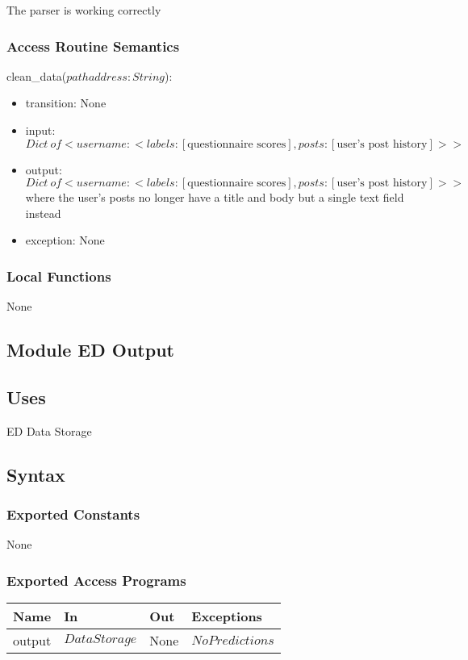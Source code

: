 \documentclass[12pt, titlepage]{article}
\begin{document}
The parser is working correctly

\subsubsection{Access Routine Semantics}

\noindent clean\_data($pathaddress: String$):
\begin{itemize}
\item transition: None
\item input: $Dict\ of <username: <labels: [\text{questionnaire scores}],  posts: [\text{user's post history}]>>$
\item output: $Dict\ of <username: <labels: [\text{questionnaire scores}],  posts: [\text{user's post history}]>>$ where the user's posts no longer have a title and body but a single text field instead
\item exception: None
\end{itemize}

\subsubsection{Local Functions}

None


\subsection{Module ED Output}

\subsection{Uses}

ED Data Storage

\subsection{Syntax}

\subsubsection{Exported Constants}

None

\subsubsection{Exported Access Programs}

\begin{center}
\begin{tabular}{p{2cm} p{6cm} p{2cm} p{3cm}}
\hline
\textbf{Name} & \textbf{In} & \textbf{Out} & \textbf{Exceptions} \\
\hline
output & $DataStorage$ & None & $NoPredictions$ \\
\hline

\end{tabular}
\end{center}
\end{document}
